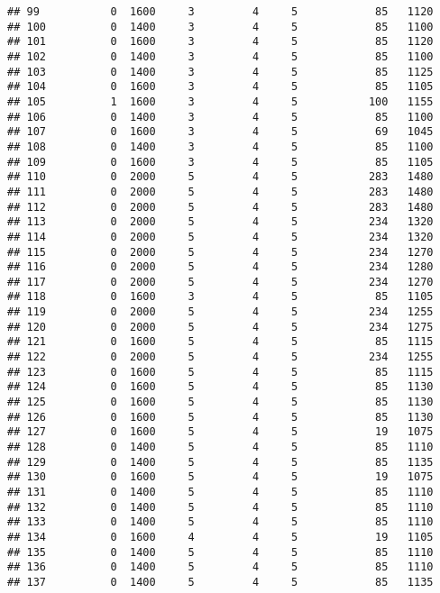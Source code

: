 \documentclass[]{article}
\begin{document}
\begin{verbatim}
## 99           0  1600     3         4     5            85   1120
## 100          0  1400     3         4     5            85   1100
## 101          0  1600     3         4     5            85   1120
## 102          0  1400     3         4     5            85   1100
## 103          0  1400     3         4     5            85   1125
## 104          0  1600     3         4     5            85   1105
## 105          1  1600     3         4     5           100   1155
## 106          0  1400     3         4     5            85   1100
## 107          0  1600     3         4     5            69   1045
## 108          0  1400     3         4     5            85   1100
## 109          0  1600     3         4     5            85   1105
## 110          0  2000     5         4     5           283   1480
## 111          0  2000     5         4     5           283   1480
## 112          0  2000     5         4     5           283   1480
## 113          0  2000     5         4     5           234   1320
## 114          0  2000     5         4     5           234   1320
## 115          0  2000     5         4     5           234   1270
## 116          0  2000     5         4     5           234   1280
## 117          0  2000     5         4     5           234   1270
## 118          0  1600     3         4     5            85   1105
## 119          0  2000     5         4     5           234   1255
## 120          0  2000     5         4     5           234   1275
## 121          0  1600     5         4     5            85   1115
## 122          0  2000     5         4     5           234   1255
## 123          0  1600     5         4     5            85   1115
## 124          0  1600     5         4     5            85   1130
## 125          0  1600     5         4     5            85   1130
## 126          0  1600     5         4     5            85   1130
## 127          0  1600     5         4     5            19   1075
## 128          0  1400     5         4     5            85   1110
## 129          0  1400     5         4     5            85   1135
## 130          0  1600     5         4     5            19   1075
## 131          0  1400     5         4     5            85   1110
## 132          0  1400     5         4     5            85   1110
## 133          0  1400     5         4     5            85   1110
## 134          0  1600     4         4     5            19   1105
## 135          0  1400     5         4     5            85   1110
## 136          0  1400     5         4     5            85   1110
## 137          0  1400     5         4     5            85   1135

\end{verbatim}
\end{document}
